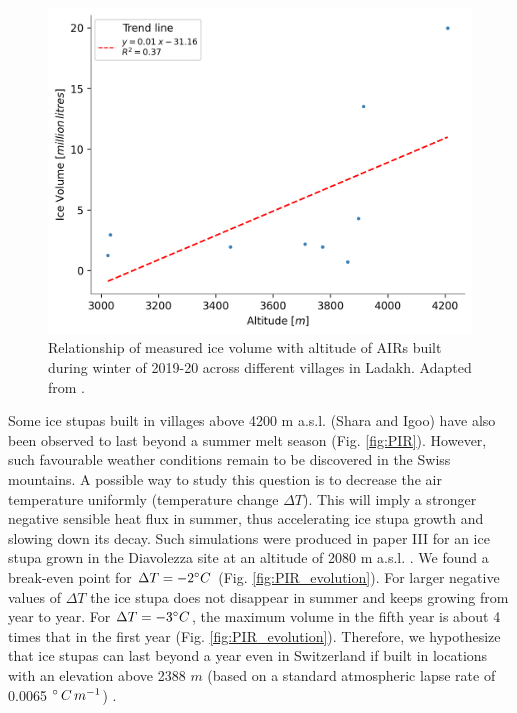 \begin{figure}[htb]
\centering
\includegraphics[width=\textwidth]{figs/altitudevsvolume.png}
\caption{Relationship of measured ice volume with altitude of AIRs built during winter of 2019-20 across
different villages in Ladakh. Adapted from \citet{mariagruberIceStupasLadakh2022}.}
\label{fig:altvsvol}
\end{figure}

Some ice stupas built in villages above 4200 m a.s.l. (Shara and Igoo) have also been observed to last beyond a
summer melt season (Fig. \ref{fig:PIR}). However, such favourable weather conditions
remain to be discovered in the Swiss mountains. A possible way to study this question is to decrease the air temperature uniformly
(temperature change $\Delta T$). This will imply a stronger negative sensible heat flux in summer, thus
accelerating ice stupa growth and slowing down its decay. Such simulations were produced in paper III for an ice
stupa grown in the Diavolezza site at an altitude of 2080 m a.s.l. . We found a break-even point for $\Delta T =
-2 ^{\circ} C$ (Fig. \ref{fig:PIR_evolution}). For larger negative values of $\Delta T$ the ice stupa does not
disappear in summer and keeps growing from year to year. For $\Delta T = -3 ^{\circ} C$, the maximum volume in
the fifth year is about 4 times that in the first year (Fig. \ref{fig:PIR_evolution}). Therefore, we hypothesize that ice stupas
can last beyond a year even in Switzerland if built in locations with an elevation above 2388 $m$ (based on a
standard atmospheric lapse rate of 0.0065 $^{\circ}\,C\,m^{-1}$) .

